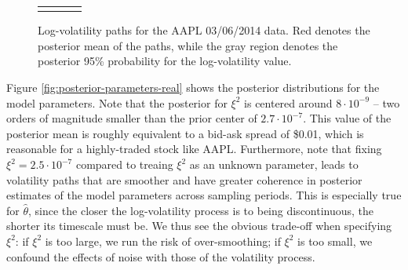 \documentclass[10pt]{article}
\newcommand{\htheta}{\hat{\theta}}
\begin{document}
\begin{figure}
\begin{tabular}{m{0.25cm}ccc}
\begin{minipage}{0.25\textwidth}
				\end{minipage}  \\
	\end{tabular}
	\caption{Log-volatility paths for the AAPL 03/06/2014 data. Red denotes the posterior mean of the paths, while the gray region denotes the posterior 95\% probability for the log-volatility value.}
	\label{fig:log-vol-real}
\end{figure}

Figure \ref{fig:posterior-parameters-real} shows the posterior distributions for the model parameters.   Note that the posterior for $\xi^2$ is centered around $8 \cdot 10^{-9}$ -- two orders of magnitude smaller than the prior center of $2.7 \cdot 10^{-7}$. This value of the posterior mean is roughly equivalent to a bid-ask spread of \$0.01, which is reasonable for a highly-traded stock like AAPL.  Furthermore, note that fixing $\xi^2 = 2.5\cdot 10^{-7}$ compared to treaing $\xi^2$ as an unknown parameter, leads to volatility paths that are smoother and have greater coherence in posterior estimates of the model parameters across sampling periods.  This is especially true for $\htheta$, since the closer the log-volatility process is to being discontinuous, the shorter its timescale must be.  We thus see the obvious trade-off when specifying $\xi^2$: if $\xi^2$ is too large, we run the risk of over-smoothing; if $\xi^2$ is too small, we confound the effects of noise with those of the volatility process.
\end{document}
